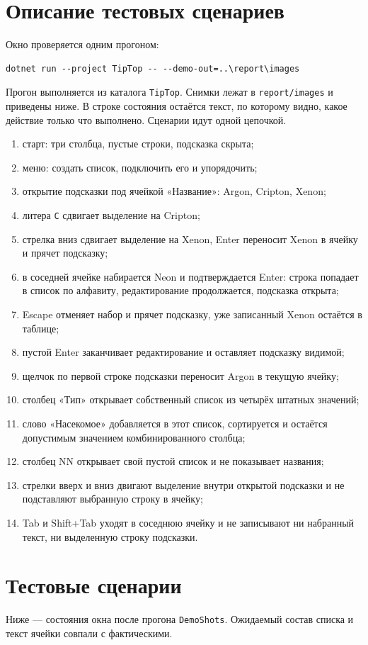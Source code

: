 \documentclass[a4paper,14pt]{extarticle}
\begin{document}
\section{Описание тестовых сценариев}
Окно проверяется одним прогоном:
\begin{Verbatim}
dotnet run --project TipTop -- --demo-out=..\report\images
\end{Verbatim}
Прогон выполняется из каталога \texttt{TipTop}. Снимки лежат в \texttt{report/images} и приведены ниже. В строке состояния остаётся текст, по которому видно, какое действие только что выполнено.
Сценарии идут одной цепочкой.
\begin{enumerate}
\item старт: три столбца, пустые строки, подсказка скрыта;
\item меню: создать список, подключить его и упорядочить;
\item открытие подсказки под ячейкой «Название»: Argon, Cripton, Xenon;
\item литера \texttt{C} сдвигает выделение на Cripton;
\item стрелка вниз сдвигает выделение на Xenon, Enter переносит Xenon в ячейку и прячет подсказку;
\item в соседней ячейке набирается Neon и подтверждается Enter: строка попадает в список по алфавиту, редактирование продолжается, подсказка открыта;
\item Escape отменяет набор и прячет подсказку, уже записанный Xenon остаётся в таблице;
\item пустой Enter заканчивает редактирование и оставляет подсказку видимой;
\item щелчок по первой строке подсказки переносит Argon в текущую ячейку;
\item столбец «Тип» открывает собственный список из четырёх штатных значений;
\item слово «Насекомое» добавляется в этот список, сортируется и остаётся допустимым значением комбинированного столбца;
\item столбец NN открывает свой пустой список и не показывает названия;
\item стрелки вверх и вниз двигают выделение внутри открытой подсказки и не подставляют выбранную строку в ячейку;
\item Tab и Shift+Tab уходят в соседнюю ячейку и не записывают ни набранный текст, ни выделенную строку подсказки.
\end{enumerate}
\section{Тестовые сценарии}
Ниже --- состояния окна после прогона \texttt{DemoShots}. Ожидаемый состав списка и текст ячейки совпали с фактическими.
\end{document}
